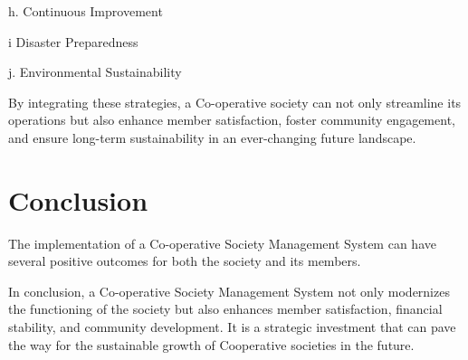 h. Continuous Improvement

i Disaster Preparedness

j. Environmental Sustainability

By integrating these strategies, a Co-operative society can not only streamline its operations but
also enhance member satisfaction, foster community engagement, and ensure long-term
sustainability in an ever-changing future landscape. 

\section{Conclusion}

The implementation of a Co-operative Society Management System can have several positive outcomes for both the society and its members.

In conclusion, a Co-operative Society Management System not only modernizes the functioning of the society but also enhances member satisfaction, financial stability, and community development. It is a strategic investment that can pave the way for the sustainable growth of Cooperative societies in the future.